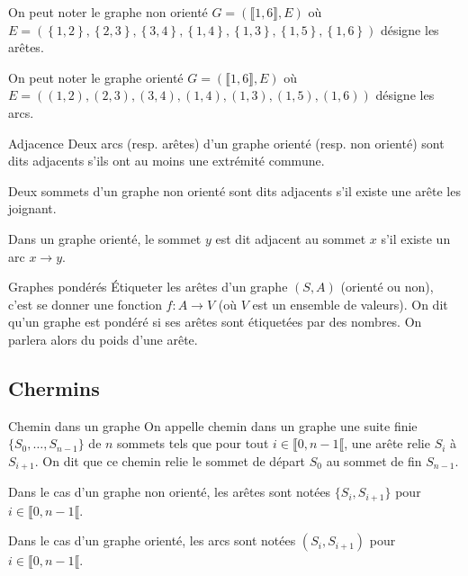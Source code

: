 \begin{rem}
On peut noter le graphe non orienté $G=\left(\llbracket 1,6\rrbracket,E\right)$ où $E=\left(
\left\{1,2\right\},\left\{2,3\right\},\left\{3,4\right\},\left\{1,4\right\},\left\{1,3\right\},\left\{1,5\right\},\left\{1,6\right\}\right)$ désigne les arêtes. 

On peut noter le graphe orienté $G=\left(\llbracket 1,6\rrbracket,E\right)$ où $E=\left(
\left(1,2\right),\left(2,3\right),\left(3,4\right),\left(1,4\right),\left(1,3\right),\left(1,5\right),\left(1,6\right)\right)$ désigne les arcs. 
\end{rem}

\begin{defi}{Adjacence}
Deux arcs (resp. arêtes) d'un graphe orienté (resp. non orienté) sont dits adjacents s'ils ont au moins une extrémité commune. 

Deux sommets d'un graphe non orienté sont dits adjacents s'il existe une arête les joignant. 

Dans un graphe orienté, le sommet $y$ est dit adjacent au sommet $x$ s'il existe un arc $x\to y$.
\end{defi}


\begin{defi}{Graphes pondérés}
Étiqueter les arêtes d’un graphe $(S, A)$ (orienté ou non), c’est se donner une fonction
$f : A \to V$ (où $V$ est un ensemble de valeurs). On dit qu’un graphe est pondéré si ses arêtes sont étiquetées par des nombres. On parlera alors du poids d’une arête.
\end{defi}
%
%

\subsection{Chermins}

\begin{defi}{Chemin dans un graphe}
On appelle chemin dans un graphe une suite finie $\{S_0, \ldots , S_{n-1}\}$ de $n$ sommets tels que pour tout
$i \in \llbracket 0, n-1\llbracket$, une arête relie $S_i$ à $S_{i+1}$. On dit que ce chemin relie le sommet de départ $S_0$ au sommet de fin $S_{n-1}$. 

Dans le cas d'un graphe non orienté, les arêtes sont notées $\{S_i, S_{i+1}\}$ pour $i \in \llbracket 0, n-1\llbracket$.

Dans le cas d'un graphe orienté, les arcs sont notées $(S_i, S_{i+1})$ pour $i \in \llbracket 0, n-1\llbracket$.
\end{defi}


